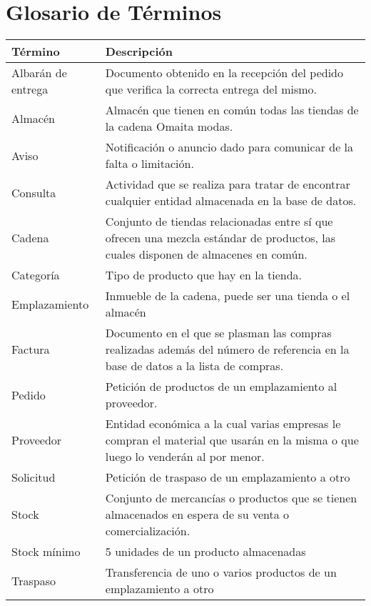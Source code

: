 \section{Glosario de Términos}
\begin{table}
	\centering
	\begin{tabularx}{\textwidth}{|l|X|}
		\hline \rowcolor{Gray}
		Término & Descripción \\
		\hline
		Albarán de entrega & Documento obtenido en la recepción del pedido que verifica la correcta entrega del mismo.\\ \hline
		Almacén & Almacén que tienen en común todas las tiendas de la cadena Omaita modas.\\ \hline
		Aviso & Notificación o anuncio dado para comunicar de la falta o limitación. \\ \hline
		Consulta & Actividad que se realiza para tratar de encontrar cualquier entidad almacenada en la base de datos. \\ \hline
		Cadena & Conjunto de tiendas relacionadas entre sí que ofrecen una mezcla estándar de productos, las cuales disponen de almacenes en común. \\ \hline
		Categoría & Tipo de producto que hay en la tienda. \\ \hline
		Emplazamiento & Inmueble de la cadena, puede ser una tienda o el almacén \\ \hline
		Factura & Documento en el que se plasman las compras realizadas además del número de referencia en la base de datos a la lista de compras.\\ \hline
		Pedido & Petición de productos de un emplazamiento al proveedor. \\ \hline
		Proveedor & Entidad económica a la cual varias empresas le compran el material que usarán en la misma o que luego lo venderán al por menor. \\ \hline
		Solicitud & Petición de traspaso de un emplazamiento a otro \\ \hline
		Stock & Conjunto de mercancías o productos que se tienen almacenados en espera de su venta o comercialización. \\ \hline
		Stock mínimo & 5 unidades de un producto almacenadas \\ \hline
		Traspaso & Transferencia de uno o varios productos de un emplazamiento a otro \\ \hline
	\end{tabularx}
\end{table}

